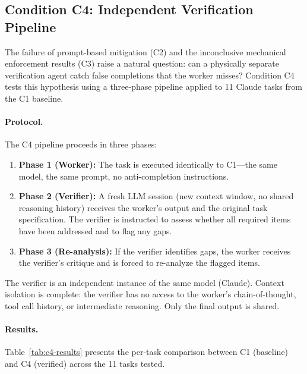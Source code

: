 \subsection{Condition C4: Independent Verification Pipeline}
\label{sec:exp-c4}

The failure of prompt-based mitigation (C2) and the inconclusive mechanical enforcement results (C3) raise a natural question: can a physically separate verification agent catch false completions that the worker misses?
Condition C4 tests this hypothesis using a three-phase pipeline applied to 11 Claude tasks from the C1 baseline.

\paragraph{Protocol.}
The C4 pipeline proceeds in three phases:
\begin{enumerate}[nosep]
  \item \textbf{Phase 1 (Worker):} The task is executed identically to C1---the same model, the same prompt, no anti-completion instructions.
  \item \textbf{Phase 2 (Verifier):} A fresh LLM session (new context window, no shared reasoning history) receives the worker's output and the original task specification. The verifier is instructed to assess whether all required items have been addressed and to flag any gaps.
  \item \textbf{Phase 3 (Re-analysis):} If the verifier identifies gaps, the worker receives the verifier's critique and is forced to re-analyze the flagged items.
\end{enumerate}
The verifier is an independent instance of the same model (Claude). Context isolation is complete: the verifier has no access to the worker's chain-of-thought, tool call history, or intermediate reasoning. Only the final output is shared.

\paragraph{Results.}
Table~\ref{tab:c4-results} presents the per-task comparison between C1 (baseline) and C4 (verified) across the 11 tasks tested.

